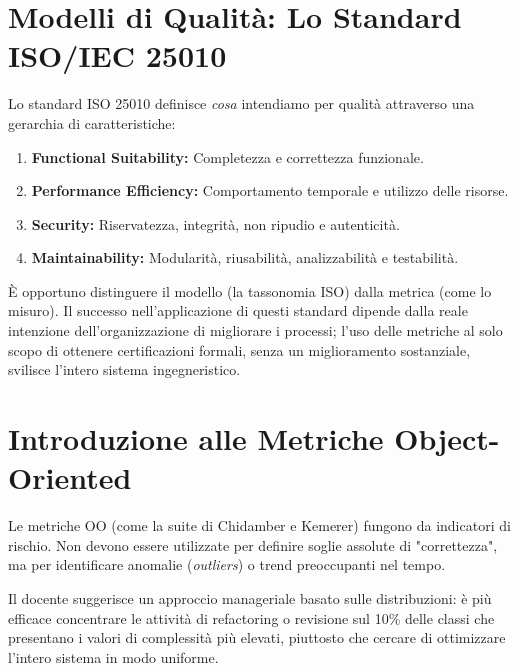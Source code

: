 \section{Modelli di Qualità: Lo Standard ISO/IEC 25010}
Lo standard ISO 25010 definisce \textit{cosa} intendiamo per qualità attraverso una gerarchia di caratteristiche:
\begin{enumerate}
    \item \textbf{Functional Suitability:} Completezza e correttezza funzionale.
    \item \textbf{Performance Efficiency:} Comportamento temporale e utilizzo delle risorse.
    \item \textbf{Security:} Riservatezza, integrità, non ripudio e autenticità.
    \item \textbf{Maintainability:} Modularità, riusabilità, analizzabilità e testabilità.
\end{enumerate}

\begin{notaprof}
È opportuno distinguere il modello (la tassonomia ISO) dalla metrica (come lo misuro). Il successo nell'applicazione di questi standard dipende dalla reale intenzione dell'organizzazione di migliorare i processi; l'uso delle metriche al solo scopo di ottenere certificazioni formali, senza un miglioramento sostanziale, svilisce l'intero sistema ingegneristico.
\end{notaprof}

\section{Introduzione alle Metriche Object-Oriented}
Le metriche OO (come la suite di Chidamber e Kemerer) fungono da indicatori di rischio. Non devono essere utilizzate per definire soglie assolute di "correttezza", ma per identificare anomalie (\textit{outliers}) o trend preoccupanti nel tempo.

\begin{notaprof}
Il docente suggerisce un approccio manageriale basato sulle distribuzioni: è più efficace concentrare le attività di refactoring o revisione sul 10\% delle classi che presentano i valori di complessità più elevati, piuttosto che cercare di ottimizzare l'intero sistema in modo uniforme.
\end{notaprof}